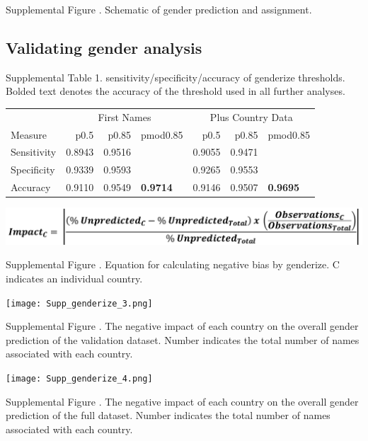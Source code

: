 \documentclass[11pt,]{article}
\begin{document}
Supplemental Figure . Schematic of gender prediction and assignment.

\newpage

\subsection{Validating gender
analysis}\label{validating-gender-analysis}

Supplemental Table 1. sensitivity/specificity/accuracy of genderize
thresholds. Bolded text denotes the accuracy of the threshold used in
all further analyses.

\begin{table}[H]
\centering
\begin{tabular}{l|r|r|l|r|r|l}
\hline
\multicolumn{1}{c|}{ } & \multicolumn{3}{c|}{First Names} & \multicolumn{3}{c}{Plus Country Data} \\
\cline{2-4} \cline{5-7}
Measure & p0.5 & p0.85 & pmod0.85 & p0.5 & p0.85 & pmod0.85\\
\hline
Sensitivity & 0.8943 & 0.9516 & \cellcolor{white}{0.971} & 0.9055 & 0.9471 & \cellcolor{white}{0.9669}\\
\hline
Specificity & 0.9339 & 0.9593 & \cellcolor{white}{0.972} & 0.9265 & 0.9553 & \cellcolor{white}{0.9727}\\
\hline
Accuracy & 0.9110 & 0.9549 & \textbf{0.9714} & 0.9146 & 0.9507 & \textbf{0.9695}\\
\hline
\end{tabular}
\end{table}

\vspace{40mm}

\includegraphics{impact_equation.png}

Supplemental Figure . Equation for calculating negative bias by
genderize. C indicates an individual country.

\newpage

\texttt{[image: Supp\_genderize\_3.png]}

Supplemental Figure . The negative impact of each country on the overall
gender prediction of the validation dataset. Number indicates the total
number of names associated with each country.

\newpage

\texttt{[image: Supp\_genderize\_4.png]}

Supplemental Figure . The negative impact of each country on the overall
gender prediction of the full dataset. Number indicates the total number
of names associated with each country.
\end{document}
